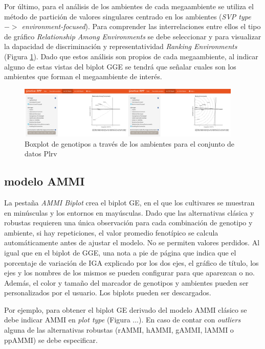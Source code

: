 Por último, para el análisis de los ambientes de cada megaambiente se utiliza el método de partición de valores singulares centrado en los ambientes (\emph{SVP type $->$ environment-focused}). Para comprender las interrelaciones entre ellos el tipo de gráfico \emph{Relationship Among Environments} se debe seleccionar y para visualizar la dapacidad de discriminación y representatividad 
\emph{Ranking Environments} (Figura \ref{fig:ggebip3}). Dado que estos análisis son propios de cada megaambiente, al indicar alguno de estas vistas del biplot GGE se tendrá que señalar cuales son los ambientes que forman el megaambiente de interés. 


\begin{figure}[H]
	\begin{center}
		\includegraphics[width=0.95\textwidth]{./Graficos/www/GGE_biplotAPP3.png}
	\end{center}
	\caption{Boxplot de genotipos a través de los ambientes para el conjunto de datos Plrv}
	\label{fig:ggebip3}
\end{figure}


\subsection{modelo AMMI}

La pestaña \emph{AMMI Biplot} crea el biplot GE, en el que los cultivares se muestran en minúsculas y los entornos en mayúsculas. Dado que las alternativas clásica y robustas requieren una única observación para cada combinación de genotipo y ambiente, si hay repeticiones, el valor promedio fenotípico se calcula automáticamente antes de ajustar el modelo. No se permiten valores perdidos. Al igual que en el biplot de GGE, una nota a pie de página que indica que el porcentaje de variación de IGA explicado por los dos ejes, el gráfico de título, los ejes y los nombres de los mismos se pueden configurar para que aparezcan o no. Además, el color y tamaño del marcador de genotipos y ambientes pueden ser personalizados por el usuario. Los biplots pueden ser descargados.

Por ejemplo, para obtener el biplot GE derivado del modelo AMMI clásico se debe indicar
AMMI en \emph{plot type} (Figura ...). En caso de contar con \emph{outliers} alguna de las alternativas robustas (rAMMI, hAMMI, gAMMI, lAMMI o ppAMMI) se debe especificar.
 

